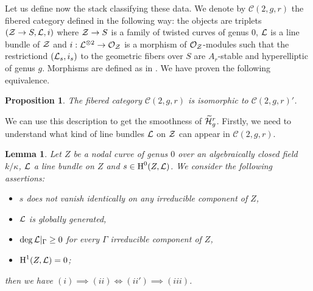 \documentclass{alggeom}
\numberwithin{equation}{section}
\numberwithin{subsection}{section}
\newtheorem{proposition}[theorem]{Proposition}
\newtheorem{lemma}[theorem]{Lemma}
\theoremstyle{definition}
\theoremstyle{remark}
\newcommand\cC{\mathcal{C}} \newcommand\cD{\mathcal{D}}
\newcommand\cO{\mathcal{O}} \newcommand\cP{\mathcal{P}}
\renewcommand\H{\operatorname{H}}
\newcommand{\Htilde}{\widetilde{\cH}}
\begin{document}
Let us define now the stack classifying these data. We denote by $\cC(2,g,r)$ the fibered category defined in the following way: the objects are triplets $(\mathcal{Z}\rightarrow S,\mathcal{L},i)$ where $\mathcal{Z} \rightarrow S$ is a family of twisted curves of genus $0$, $\mathcal{L}$ is a line bundle of $\mathcal{Z}$ and $i:\cL^{\otimes 2}\rightarrow \cO_{\cZ}$ is a morphism of $\cO_{\cZ}$-modules such that the restrictiond $(\mathcal{L}_s,i_s)$ to the geometric fibers over $S$ are $A_r$-stable and hyperelliptic of genus $g$.  Morphisms are defined as in \cite{ArVis}. We have proven the following equivalence.

\begin{proposition}\label{prop:descr-hyper}
	The fibered category $\cC(2,g,r)$ is isomorphic to $\cC(2,g,r)'$.
\end{proposition}



We can use this description to get the smoothness of $\Htilde_g^r$. Firstly, we need to understand what kind of line bundles $\mathcal{L}$ on $\mathcal{Z}$ can appear in $\cC(2,g,r)$.

\begin{lemma}\label{lem:hyp-line-bun}
	Let $Z$ be a nodal curve of genus $0$ over an algebraically closed field $k/\kappa$, $\mathcal{L}$ a line bundle on $Z$ and $s \in \H^0(Z,\cL)$. We consider the following assertions:
	\begin{itemize}
		\item[$(i)$] $s$ does not vanish identically on any irreducible component of $Z$,
		\item[$(ii)$] $\mathcal{L}$ is globally generated,
		\item[$(ii')$] $\deg \mathcal{L}\vert_{\Gamma}\geq 0$ for every $\Gamma$ irreducible component of $Z$,
		\item[$(iii)$] $\H^1(Z,\cL)=0$;
	\end{itemize}
	then we have $(i)\implies (ii)\iff (ii')\implies (iii)$.
\end{lemma}
\end{document}
